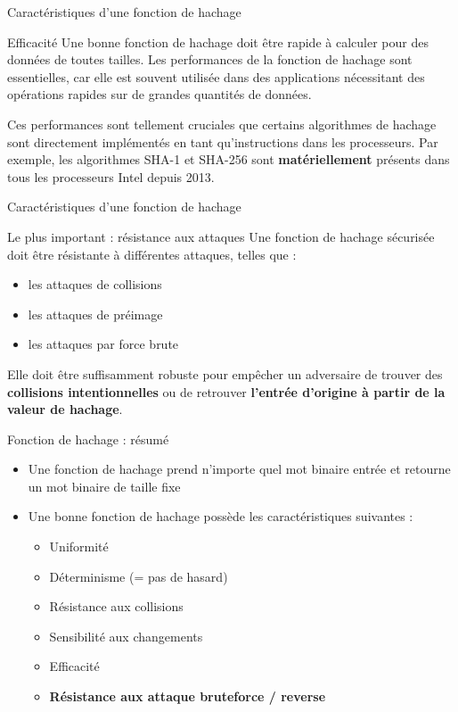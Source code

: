 \begin{frame}{Caractéristiques d'une fonction de hachage}
  \begin{block}{Efficacité}
    Une bonne fonction de hachage doit être rapide à calculer pour des données de toutes tailles.
    Les performances de la fonction de hachage sont essentielles, car elle est souvent utilisée dans des applications nécessitant des opérations rapides sur de grandes quantités de données.

    \vspace*{1em}

    Ces performances sont tellement cruciales que certains algorithmes de hachage sont directement implémentés en tant qu'instructions dans les processeurs.
    Par exemple, les algorithmes SHA-1 et SHA-256 sont \textbf{matériellement} présents dans tous les processeurs Intel depuis 2013.
  \end{block}
\end{frame}

\begin{frame}{Caractéristiques d'une fonction de hachage}
  \begin{block}{Le plus important : résistance aux attaques}
    Une fonction de hachage sécurisée doit être résistante à différentes attaques, telles que :

    \begin{itemize}
      \item les attaques de collisions
      \item les attaques de préimage
      \item les attaques par force brute
    \end{itemize}

    Elle doit être suffisamment robuste pour empêcher un adversaire de trouver des \textbf{collisions intentionnelles} ou de retrouver \textbf{l'entrée d'origine à partir de la valeur de hachage}.
  \end{block}
\end{frame}

\begin{frame}{Fonction de hachage : résumé}
  \begin{itemize}
    \item Une fonction de hachage prend n'importe quel mot binaire entrée et retourne un mot binaire de taille fixe
    \item Une bonne fonction de hachage possède les caractéristiques suivantes :
          \begin{itemize}
            \item Uniformité
            \item Déterminisme (= pas de hasard)
            \item Résistance aux collisions
            \item Sensibilité aux changements
            \item Efficacité
            \item \textbf{Résistance aux attaque bruteforce / reverse}
          \end{itemize}
  \end{itemize}
\end{frame}

